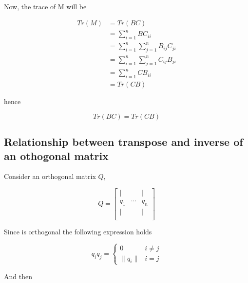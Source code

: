 \documentclass{article}
\begin{document}
    Now, the trace of M will be

    \begin{equation*}
        \begin{aligned}
            Tr(M) &= Tr(BC)\\
                  &= \sum_{i=1}^n BC_{ii}\\
                  &= \sum_{i=1}^n \sum_{j=1}^n B_{ij} C_{ji}\\
                  &= \sum_{i=1}^n \sum_{j=1}^n C_{ij} B_{ji}\\
                  &= \sum_{i=1}^n CB_{ii}\\
                  &= Tr(CB)
        \end{aligned}
    \end{equation*}

    hence

    \begin{equation*}
        Tr(BC) = Tr(CB)
    \end{equation*}

    \subsection{Relationship between transpose and inverse of an othogonal matrix}
    \label{orthogonal}
    
    Consider an orthogonal matrix $Q$, 

    \[
        Q =
        \begin{bmatrix}
             |  &        &  | \\
            q_1 & \cdots & q_n\\
             |  &        &  | \\
        \end{bmatrix}
    \]

    Since is orthogonal the following expression holds

    \[
        q_i q_j = 
        \begin{cases} 
           0 & i \neq j \\
           \lVert q_i \rVert & i = j 
        \end{cases}
    \]

    And then
\end{document}
